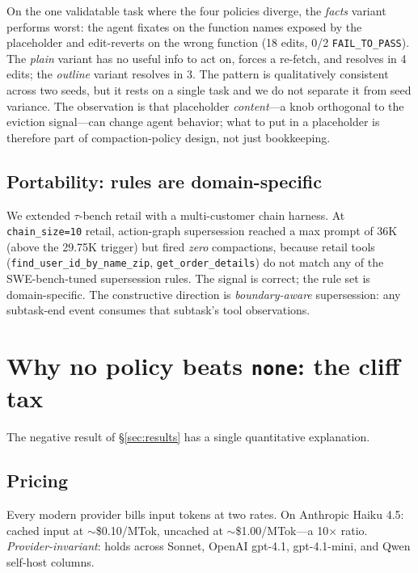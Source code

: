 \documentclass[letterpaper,twocolumn,10pt]{article}
\begin{document}
On the one validatable task where the four policies diverge, the
\emph{facts} variant performs worst: the agent fixates on the
function names exposed by the placeholder and edit-reverts on the
wrong function (18 edits, 0/2 \texttt{FAIL\_TO\_PASS}). The
\emph{plain} variant has no useful info to act on, forces a
re-fetch, and resolves in 4 edits; the \emph{outline} variant
resolves in 3. The pattern is qualitatively consistent across two
seeds, but it rests on a single task and we do not separate it
from seed variance. The observation is that placeholder
\emph{content}---a knob orthogonal to the eviction signal---can
change agent behavior; what to put in a placeholder is therefore
part of compaction-policy design, not just bookkeeping.

\subsection{Portability: rules are domain-specific}

We extended $\tau$-bench retail with a multi-customer chain
harness. At \texttt{chain\_size=10} retail, action-graph
supersession reached a max prompt of 36K (above the 29.75K trigger)
but fired \emph{zero} compactions, because retail tools
(\texttt{find\_user\_id\_by\_name\_zip}, \texttt{get\_order\_details})
do not match any of the SWE-bench-tuned supersession rules. The
signal is correct; the rule set is domain-specific. The
constructive direction is \emph{boundary-aware} supersession: any
subtask-end event consumes that subtask's tool observations.

\section{Why no policy beats \texttt{none}: the cliff tax}
\label{sec:cliff_tax}

The negative result of \S\ref{sec:results} has a single
quantitative explanation.

\subsection{Pricing}

Every modern provider bills input tokens at two rates. On Anthropic
Haiku 4.5: cached input at $\sim$\$0.10/MTok, uncached at
$\sim$\$1.00/MTok---a 10$\times$ ratio. \emph{Provider-invariant}:
holds across Sonnet, OpenAI gpt-4.1, gpt-4.1-mini, and Qwen
self-host columns.
\end{document}
